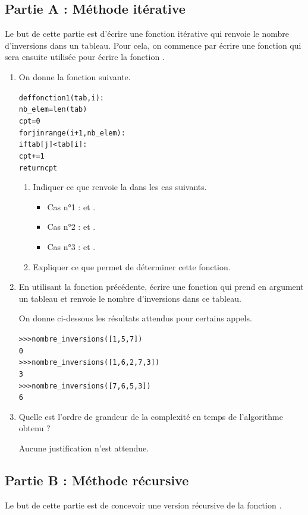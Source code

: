 \documentclass[11pt,a4paper,french,twoside]{PMCours}
\begin{document}
\subsection*{Partie A : Méthode itérative}
Le but de cette partie est d'écrire une fonction itérative  qui renvoie le
nombre d'inversions dans un tableau. Pour cela, on commence par écrire une fonction
 qui sera ensuite utilisée pour écrire la fonction .
\begin{enumerate}
    \item On donne la fonction suivante.
\begin{alltt}
def fonction1(tab, i):
    nb_elem = len(tab)
    cpt = 0
    for j in range(i+1, nb_elem):
        if tab[j] < tab[i]:
            cpt += 1
    return cpt
\end{alltt}
\begin{enumerate}
\item Indiquer ce que renvoie la  dans les cas suivants.
\begin{itemize}
\item Cas n°1 :  et .
\item Cas n°2 :  et .
\item Cas n°3 :  et .
\end{itemize}
\item Expliquer ce que permet de déterminer cette fonction.
\end{enumerate}
\item En utilisant la fonction précédente, écrire une fonction  qui
prend en argument un tableau et renvoie le nombre d'inversions dans ce tableau.

On donne ci-dessous les résultats attendus pour certains appels.
\begin{alltt}
>>> nombre\_inversions([1, 5, 7])
0
>>> nombre\_inversions([1, 6, 2, 7, 3])
3
>>> nombre\_inversions([7, 6, 5, 3])
6
\end{alltt}
\item Quelle est l'ordre de grandeur de la complexité en temps de l'algorithme obtenu ?

Aucune justification n'est attendue.
\end{enumerate}

\subsection*{Partie B : Méthode récursive}
Le but de cette partie est de concevoir une version récursive de la fonction
.
\end{document}
